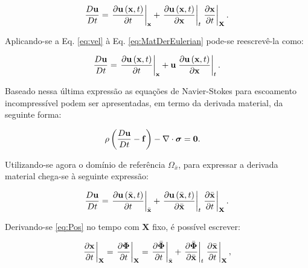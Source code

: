 \documentclass[tese_patricia]{subfiles}%
\begin{document}
\begin{align}
	\frac{D\mathbf{u}}{Dt} = \left. \frac{\partial\mathbf{u}\left(\mathbf{x},t\right)}{\partial t} \right|_\mathbf{x} + \left. \frac{\partial\mathbf{u}\left(\mathbf{x},t\right)}{\partial \mathbf{x}} \right|_{t} \left. \frac{\partial\mathbf{x}}{\partial t} \right|_{\mathbf{X}}. \label{eq:MatDerEulerian}
\end{align}

Aplicando-se a Eq. \eqref{eq:vel} à Eq. \eqref{eq:MatDerEulerian} pode-se reescrevê-la como:

\begin{align}
	\frac{D\mathbf{u}}{Dt} = \left. \frac{\partial\mathbf{u}\left(\mathbf{x},t\right)}{\partial t} \right|_\mathbf{x} + \mathbf{u} \left. \frac{\partial\mathbf{u}\left(\mathbf{x},t\right)}{\partial \mathbf{x}} \right|_{t}. \label{eq:MatDerEulerianUp}
\end{align}

Baseado nessa última expressão as equações de Navier-Stokes para escoamento incompressível podem ser apresentadas, em termo da derivada material, da seguinte forma:

\begin{align}
	\rho\left(\frac{D\mathbf{u}}{Dt} - \mathbf{f} \right) - \nabla \cdot \boldsymbol{\sigma} &= \mathbf{0}. \label{Navier-Stokes-MatDerEuleriana}
\end{align}

Utilizando-se agora o domínio de referência $\Omega_{\bar{x}}$, para expressar a derivada material chega-se à seguinte expressão:

\begin{align}
	\frac{D\mathbf{u}}{Dt} = \left. \frac{\partial\mathbf{u}\left(\bar{\mathbf{x}},t\right)}{\partial t} \right|_{\bar{\mathbf{x}}} + \left. \frac{\partial\mathbf{u}\left(\bar{\mathbf{x}},t\right)}{\partial \bar{\mathbf{x}}} \right|_{t} \left. \frac{\partial\bar{\mathbf{x}}}{\partial t} \right|_{\mathbf{X}}. \label{eq:MatDerALE}
\end{align}
%

Derivando-se \eqref{eq:Pos} no tempo com $\mathbf{X}$ fixo, é possível escrever:

\begin{align}
	\left. \frac{\partial \mathbf{x}}{\partial t} \right|_{\mathbf{X}} = \left . \frac{\partial \mathbf{\Phi}}{\partial t} \right|_{\mathbf{X}} =   \left . \frac{\partial \bar{\mathbf{\Phi}}}{\partial t} \right|_{\bar{\mathbf{x}}} + \left . \frac{\partial \bar{\mathbf{\Phi}}}{\partial \bar{\mathbf{x}}} \right|_{t} \left . \frac{\partial \bar{\mathbf{x}}}{\partial t} \right|_{\mathbf{X}},
\end{align}
\end{document}

